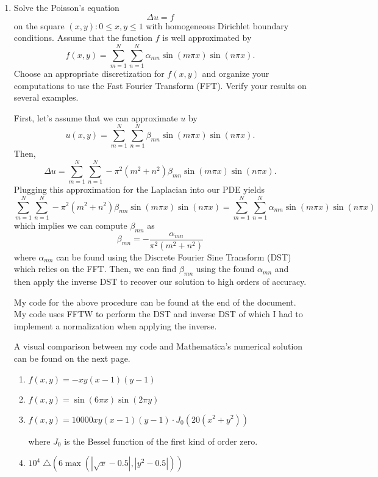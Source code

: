 \documentclass[a4paper,12pt]{article}
\newcommand{\abs}[1]{\left| #1 \right|}
\begin{document}
\begin{enumerate}[label = (\arabic*)]
	\item Solve the Poisson's equation
	\[
		\Delta u = f
	\]
	on the square $ (x,y) : 0 \leq x,y \leq 1 $ with homogeneous Dirichlet boundary conditions. Assume that the function $ f $ is well approximated by
	\[
		f(x,y) = \sum_{m = 1}^{N} \sum_{n = 1}^{N} \alpha_{mn} \sin(m \pi x) \sin(n \pi x).
	\]
	Choose an appropriate discretization for $ f(x,y) $ and organize your computations to use the Fast Fourier Transform (FFT). Verify your results on several examples.
	
	First, let's assume that we can approximate $ u $ by
	\[
		u(x,y) = \sum_{m = 1}^N \sum_{n = 1}^N \beta_{mn} \sin(m \pi x) \sin(n \pi x).
	\]
	Then,
	\[
		\Delta u =  \sum_{m = 1}^N \sum_{n = 1}^N -\pi^2(m^2 + n^2) \beta_{mn} \sin(m \pi x) \sin(n \pi x).
	\]
	Plugging this approximation for the Laplacian into our PDE yields
	\[
		\sum_{m = 1}^N \sum_{n = 1}^N -\pi^2(m^2 + n^2) \beta_{mn} \sin(m \pi x) \sin(n \pi x) = 
		\sum_{m = 1}^N \sum_{n = 1}^N \alpha_{mn} \sin(m \pi x) \sin(n \pi x)
	\]
	which implies we can compute $ \beta_{mn} $ as 
	\[
		\beta_{mn} = - \frac{\alpha_{mn}}{\pi^2(m^2 + n^2)}
	\]
	where $ \alpha_{mn} $ can be found using the Discrete Fourier Sine Transform (DST) which relies on the FFT. Then, we can find $ \beta_{mn} $ using the found $ \alpha_{mn} $ and then apply the inverse DST to recover our solution to high orders of accuracy. 
	
	My code for the above procedure can be found at the end of the document. My code uses FFTW to perform the DST and inverse DST of which I had to implement a normalization when applying the inverse. 
	
	A visual comparison between my code and Mathematica's numerical solution can be found on the next page.
	
	\newpage
	\begin{enumerate}[label = (\alph*)]
		\item $ f(x,y) = -xy(x-1)(y - 1) $
		
		\item $ f(x,y) = \sin(6 \pi x)\sin(2 \pi y) $
		
		\item $ f(x,y) = 10000 x y (x - 1) (y - 1) \cdot J_0\left (20\left (x^2 + y^2 \right) \right) $ 
		
		where $ J_0 $ is the Bessel function of the first kind of order zero.
		
		\item $ 10^4\; \triangle(6 \max (\abs{\sqrt{x} - 0.5} , \abs{y^2 - 0.5} )) $
		

\end{enumerate}
\end{enumerate}
\end{document}
